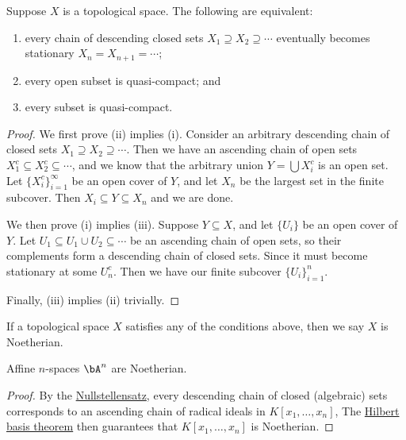 \begin{proposition}\label{prop:noetherian-top-condition}
    Suppose \(X\) is a topological space.
    The following are equivalent:
    \begin{enumerate}[label={(\roman*)}]
        \item every chain of descending closed sets \(X_1 \supseteq X_2 \supseteq \cdots\)
            eventually becomes stationary \(X_n = X_{n+1} = \cdots\);
        \item every open subset is quasi-compact; and
        \item every subset is quasi-compact.
    \end{enumerate}
\end{proposition}
\begin{proof}
    We first prove (ii) implies (i).
    Consider an arbitrary descending chain of closed sets \(X_1 \supseteq X_2 \supseteq \cdots\).
    Then we have an ascending chain of open sets \(X_1^c \subseteq X_2^c \subseteq \cdots\),
    and we know that the arbitrary union \(Y = \bigcup X_i^c\) is an open set.
    Let \({\{X_i^c\}}_{i=1}^\infty\) be an open cover of \(Y\),
    and let \(X_n\) be the largest set in the finite subcover.
    Then \(X_i \subseteq Y \subseteq X_n\) and we are done.

    We then prove (i) implies (iii).
    Suppose \(Y \subseteq X\), and let \({\{U_i\}}\) be an open cover of \(Y\).
    Let \(U_1 \subseteq U_1 \cup U_2 \subseteq \cdots\) be an ascending chain of open sets,
    so their complements form a descending chain of closed sets.
    Since it must become stationary at some \(U_n^c\).
    Then we have our finite subcover \({\{U_i\}}_{i=1}^n\).

    Finally, (iii) implies (ii) trivially.
\end{proof}
\begin{definition}
    If a topological space \(X\) satisfies any of the conditions above,
    then we say \(X\) is Noetherian.
\end{definition}
\begin{lemma}\label{lem:affine-noetherian}
    Affine \(n\)-spaces \(\bA^n\) are Noetherian.
\end{lemma}
\begin{proof}
    By the \hyperref[thm:nullstellensatz]{Nullstellensatz},
    every descending chain of closed (algebraic) sets
    corresponds to an ascending chain of radical ideals in \(K[x_1,\hdots,x_n]\),
    The \hyperref[cor:hilbert-basis]{Hilbert basis theorem}
    then guarantees that \(K[x_1,\hdots,x_n]\) is Noetherian.
\end{proof}
